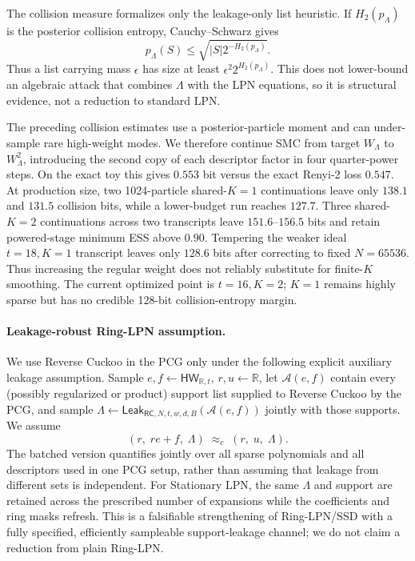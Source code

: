 The collision measure formalizes only the leakage-only list heuristic.  If
$H_2(p_\Lambda)$ is the posterior collision entropy, Cauchy--Schwarz gives
\[
 p_\Lambda(S)\leq\sqrt{|S|2^{-H_2(p_\Lambda)}}.
\]
Thus a list carrying mass $\epsilon$ has size at least
$\epsilon^2 2^{H_2(p_\Lambda)}$.  This does not lower-bound an algebraic attack
that combines $\Lambda$ with the LPN equations, so it is structural evidence,
not a reduction to standard LPN.

The preceding collision estimates use a posterior-particle moment and can
under-sample rare high-weight modes.  We therefore continue SMC from target
$W_\Lambda$ to $W_\Lambda^2$, introducing the second copy of each descriptor
factor in four quarter-power steps.  On the exact toy this gives $0.553$ bit
versus the exact Renyi-2 loss $0.547$.  At production size, two 1024-particle
shared-$K=1$ continuations leave only $138.1$ and $131.5$ collision bits, while
a lower-budget run reaches $127.7$.  Three shared-$K=2$ continuations across
two transcripts leave $151.6$--$156.5$ bits and retain powered-stage minimum
ESS above $0.90$.  Tempering the weaker ideal $t=18,K=1$ transcript leaves
only $128.6$ bits after correcting to fixed $N=65536$.  Thus increasing the
regular weight does not reliably substitute for finite-$K$ smoothing.  The
current optimized point is $t=16,K=2$; $K=1$ remains highly sparse but has no
credible 128-bit collision-entropy margin.

\paragraph{Leakage-robust Ring-LPN assumption.}
We use Reverse Cuckoo in the PCG only under the following explicit auxiliary
leakage assumption.  Sample $e,f\gets\mathsf{HW}_{\mathbb R,t}$,
$r,u\gets\mathbb R$, let $\mathcal A(e,f)$ contain every (possibly regularized
or product) support list supplied to Reverse Cuckoo by the PCG, and sample
$\Lambda\gets\mathsf{Leak}_{\mathsf{RC},N,t,w,d,B}(\mathcal A(e,f))$ jointly with those supports.
We assume
\begin{equation}\label{eq:ring-lpn-revcuckoo-leakage}
  (r,\;r e+f,\;\Lambda)
       \;\approx_c\;
  (r,\;u,\;\Lambda).
\end{equation}
The batched version quantifies jointly over all sparse polynomials and all
descriptors used in one PCG setup, rather than assuming that leakage from
different sets is independent.  For Stationary LPN, the same $\Lambda$ and
support are retained across the prescribed number of expansions while the
coefficients and ring masks refresh.  This is a falsifiable strengthening of
Ring-LPN/SSD with a fully specified, efficiently sampleable support-leakage
channel; we do not claim a reduction from plain Ring-LPN.

